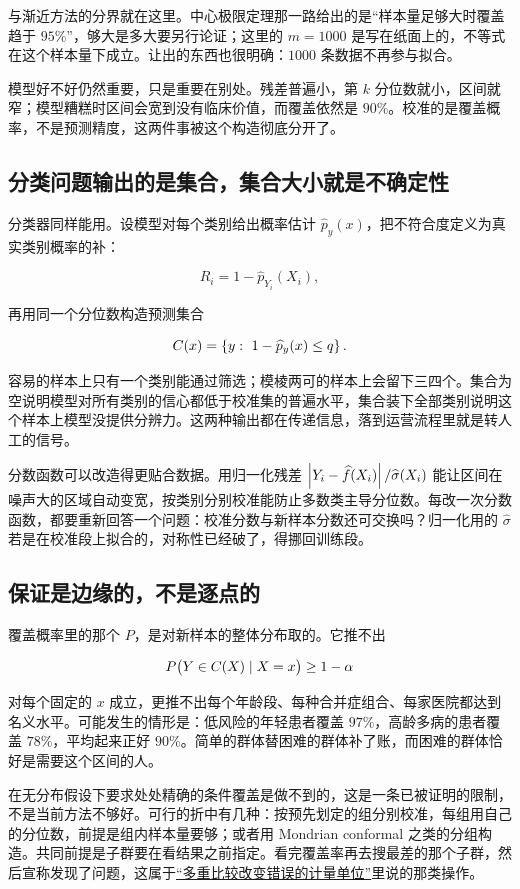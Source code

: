 与渐近方法的分界就在这里。中心极限定理那一路给出的是``样本量足够大时覆盖趋于 \(95\%\)''，够大是多大要另行论证；这里的 \(m=1000\) 是写在纸面上的，不等式在这个样本量下成立。让出的东西也很明确：\(1000\) 条数据不再参与拟合。

模型好不好仍然重要，只是重要在别处。残差普遍小，第 \(k\) 分位数就小，区间就窄；模型糟糕时区间会宽到没有临床价值，而覆盖依然是 \(90\%\)。校准的是覆盖概率，不是预测精度，这两件事被这个构造彻底分开了。

\subsection{分类问题输出的是集合，集合大小就是不确定性}

分类器同样能用。设模型对每个类别给出概率估计 \(\widehat p_y(x)\)，把不符合度定义为真实类别概率的补：

\[
R_i=1-\widehat p_{Y_i}(X_i),
\]

再用同一个分位数构造预测集合

\[
C(x)=\left\{y:\ 1-\widehat p_y(x)\le q\right\}.
\]

容易的样本上只有一个类别能通过筛选；模棱两可的样本上会留下三四个。集合为空说明模型对所有类别的信心都低于校准集的普遍水平，集合装下全部类别说明这个样本上模型没提供分辨力。这两种输出都在传递信息，落到运营流程里就是转人工的信号。

分数函数可以改造得更贴合数据。用归一化残差 \(\left|Y_i-\widehat f(X_i)\right|/\widehat\sigma(X_i)\) 能让区间在噪声大的区域自动变宽，按类别分别校准能防止多数类主导分位数。每改一次分数函数，都要重新回答一个问题：校准分数与新样本分数还可交换吗？归一化用的 \(\widehat\sigma\) 若是在校准段上拟合的，对称性已经破了，得挪回训练段。

\subsection{保证是边缘的，不是逐点的}

覆盖概率里的那个 \(P\)，是对新样本的整体分布取的。它推不出

\[
P\bigl(Y\in C(X)\mid X=x\bigr)\ge 1-\alpha
\]

对每个固定的 \(x\) 成立，更推不出每个年龄段、每种合并症组合、每家医院都达到名义水平。可能发生的情形是：低风险的年轻患者覆盖 \(97\%\)，高龄多病的患者覆盖 \(78\%\)，平均起来正好 \(90\%\)。简单的群体替困难的群体补了账，而困难的群体恰好是需要这个区间的人。

在无分布假设下要求处处精确的条件覆盖是做不到的，这是一条已被证明的限制，不是当前方法不够好。可行的折中有几种：按预先划定的组分别校准，每组用自己的分位数，前提是组内样本量要够；或者用 Mondrian conformal 之类的分组构造。共同前提是子群要在看结果之前指定。看完覆盖率再去搜最差的那个子群，然后宣称发现了问题，这属于\hyperref[sec:11-Mathematical-Statistics/05-Hypothesis-Testing/04]{``多重比较改变错误的计量单位''}里说的那类操作。

